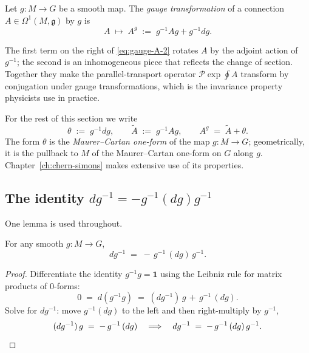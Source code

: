 \begin{definition}\label{def:gauge-transf}
Let $g : M \to G$ be a smooth map. The \emph{gauge transformation} of a connection $A \in \Omega^1(M, \mathfrak{g})$ by $g$ is
\begin{equation}\label{eq:gauge-A-2}
A \;\longmapsto\; A^g \;:=\; g^{-1} A g + g^{-1} dg.
\end{equation}
\end{definition}

The first term on the right of \eqref{eq:gauge-A-2} rotates $A$ by the adjoint action of $g^{-1}$; the second is an inhomogeneous piece that reflects the change of section. Together they make the parallel-transport operator $\mathcal{P} \exp \oint A$ transform by conjugation under gauge transformations, which is the invariance property physicists use in practice.

\begin{remark}\label{rem:theta-tildeA}
For the rest of this section we write
\begin{equation}\label{eq:theta-tildeA-def}
\theta \;:=\; g^{-1} dg, \qquad \tilde A \;:=\; g^{-1} A g, \qquad A^g \;=\; \tilde A + \theta.
\end{equation}
The form $\theta$ is the \emph{Maurer--Cartan one-form} of the map $g : M \to G$; geometrically, it is the pullback to $M$ of the Maurer--Cartan one-form on $G$ along $g$. Chapter~\ref{ch:chern-simons} makes extensive use of its properties.
\end{remark}

\subsection{The identity $dg^{-1} = -g^{-1}(dg) g^{-1}$}

One lemma is used throughout.

\begin{lemma}\label{lem:dginv}
For any smooth $g : M \to G$,
\begin{equation}\label{eq:dginv-lemma}
dg^{-1} \;=\; -\, g^{-1}\, (dg)\, g^{-1}.
\end{equation}
\end{lemma}

\begin{proof}
Differentiate the identity $g^{-1} g = \mathbf{1}$ using the Leibniz rule for matrix products of $0$-forms:
\begin{equation*}
0 \;=\; d(g^{-1} g) \;=\; (dg^{-1})\, g \,+\, g^{-1}\, (dg).
\end{equation*}
Solve for $dg^{-1}$: move $g^{-1}(dg)$ to the left and then right-multiply by $g^{-1}$,
\begin{equation*}
(dg^{-1})\, g \;=\; -\, g^{-1}\, (dg) \quad\Longrightarrow\quad dg^{-1} \;=\; -\, g^{-1}\, (dg)\, g^{-1}. \qedhere
\end{equation*}
\end{proof}

